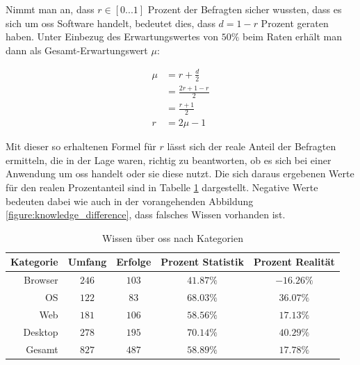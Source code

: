 \documentclass[a4paper]{article}
\begin{document}
                Nimmt man an, dass $r \in \left[0...1\right]$ Prozent der Befragten sicher wussten, dass es sich um \gls{oss} Software handelt, bedeutet dies, dass $d = 1 - r$ Prozent geraten haben. Unter Einbezug des Erwartungswertes von $50 \%$ beim Raten erhält man dann als Gesamt-Erwartungswert $\mu$:
            
                \begin{equation}
                \begin{split}
                    \mu &= r + \frac{d}{2} \\
                        &= \frac{2r + 1 - r}{2} \\
                        &= \frac{r + 1}{2} \\
                    r   &= 2\mu - 1
                \end{split}
                \end{equation}
            
                Mit dieser so erhaltenen Formel für $r$ lässt sich der reale Anteil der Befragten ermitteln, die in der Lage waren, richtig zu beantworten, ob es sich bei einer Anwendung um \gls{oss} handelt oder sie diese nutzt. Die sich daraus ergebenen Werte für den realen Prozentanteil sind in Tabelle \ref{table:knowledge_by_category} dargestellt. Negative Werte bedeuten dabei wie auch in der vorangehenden Abbildung \ref{figure:knowledge_difference}, dass falsches Wissen vorhanden ist.
                
                
                \begin{table}
                    \centering
                    \begin{tabular}{rcccc}
                        Kategorie & Umfang & Erfolge & Prozent Statistik & Prozent Realität \\\hline\hline
                        Browser & $246$ & $103$ & $41.87\%$ & $-16.26\%$\\
                        OS & $122$ & $83$ & $68.03\%$ & $36.07\%$\\
                        Web & $181$ & $106$ & $58.56\%$ & $17.13\%$\\
                        Desktop & $278$ & $195$ & $70.14\%$ & $40.29\%$\\\hline
                        Gesamt & $827$ & $487$ & $58.89\%$ & $17.78\%$
                    \end{tabular}
                    \caption{Wissen über \gls{oss} nach Kategorien}
                    \label{table:knowledge_by_category}
                \end{table}
                
\end{document}
